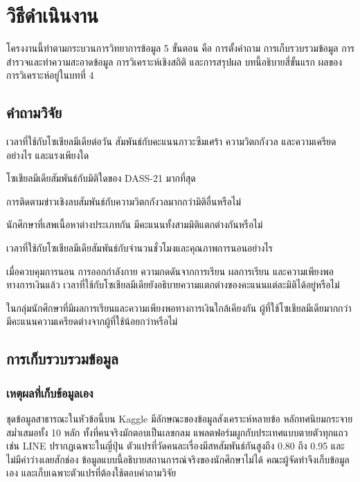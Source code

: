 \chapter{วิธีดำเนินงาน}

โครงงานนี้ทำตามกระบวนการวิทยาการข้อมูล 5 ขั้นตอน
คือ การตั้งคำถาม การเก็บรวบรวมข้อมูล การสำรวจและทำความสะอาดข้อมูล การวิเคราะห์เชิงสถิติ และการสรุปผล
บทนี้อธิบายสี่ขั้นแรก ผลของการวิเคราะห์อยู่ในบทที่ 4

\section{คำถามวิจัย}

\begin{subitems}
    \item เวลาที่ใช้กับโซเชียลมีเดียต่อวัน สัมพันธ์กับคะแนนภาวะซึมเศร้า ความวิตกกังวล และความเครียดอย่างไร และแรงเพียงใด
    \item โซเชียลมีเดียสัมพันธ์กับมิติใดของ DASS-21 มากที่สุด
    \item การติดตามข่าวเชิงลบสัมพันธ์กับความวิตกกังวลมากกว่ามิติอื่นหรือไม่
    \item นักศึกษาที่เสพเนื้อหาต่างประเภทกัน มีคะแนนทั้งสามมิติแตกต่างกันหรือไม่
    \item เวลาที่ใช้กับโซเชียลมีเดียสัมพันธ์กับจำนวนชั่วโมงและคุณภาพการนอนอย่างไร
    \item เมื่อควบคุมการนอน การออกกำลังกาย ความกดดันจากการเรียน ผลการเรียน และความเพียงพอทางการเงินแล้ว เวลาที่ใช้กับโซเชียลมีเดียยังอธิบายความแตกต่างของคะแนนแต่ละมิติได้อยู่หรือไม่
    \item ในกลุ่มนักศึกษาที่มีผลการเรียนและความเพียงพอทางการเงินใกล้เคียงกัน ผู้ที่ใช้โซเชียลมีเดียมากกว่ามีคะแนนความเครียดต่างจากผู้ที่ใช้น้อยกว่าหรือไม่
\end{subitems}

\section{การเก็บรวบรวมข้อมูล}

\subsection{เหตุผลที่เก็บข้อมูลเอง}

ชุดข้อมูลสาธารณะในหัวข้อนี้บน Kaggle \cite{singh_student_social_media,singh_social_media_addiction}
มีลักษณะของข้อมูลสังเคราะห์หลายข้อ
หลักทศนิยมกระจายสม่ำเสมอทั้ง 10 หลัก ทั้งที่คนจริงมักตอบเป็นเลขกลม
แพลตฟอร์มผูกกับประเทศแบบตายตัวทุกแถว เช่น LINE ปรากฏเฉพาะในญี่ปุ่น
ตัวแปรที่วัดคนละเรื่องมีสหสัมพันธ์กันสูงถึง 0.80 ถึง 0.95
และไม่มีค่าว่างเลยสักช่อง
ข้อมูลแบบนี้อธิบายสถานการณ์จริงของนักศึกษาไม่ได้
คณะผู้จัดทำจึงเก็บข้อมูลเอง และเก็บเฉพาะตัวแปรที่ต้องใช้ตอบคำถามวิจัย

